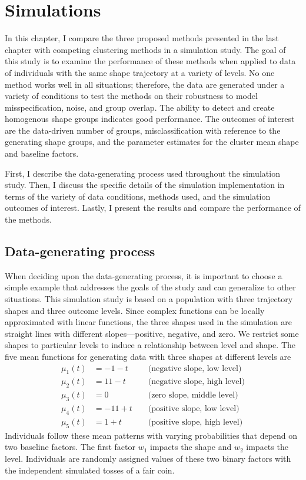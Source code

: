 \chapter{Simulations}
\label{chap:sim}
In this chapter, I compare the three proposed methods presented in the last chapter with competing clustering methods in a simulation study. The goal of this study is to examine the performance of these methods when applied to data of individuals with the same shape trajectory at a variety of levels. No one method works well in all situations; therefore, the data are generated under a variety of conditions to test the methods on their robustness to model misspecification, noise, and group overlap. The ability to detect and create homogenous shape groups indicates good performance. The outcomes of interest are the data-driven number of groups, misclassification with reference to the generating shape groups, and the parameter estimates for the cluster mean shape and baseline factors. 

First, I describe the data-generating process used throughout the simulation study. Then, I discuss the specific details of the simulation implementation in terms of the variety of data conditions, methods used, and the simulation outcomes of interest. Lastly, I present the results and compare the performance of the methods.

\section{Data-generating process}
When deciding upon the data-generating process, it is important to choose a simple example that addresses the goals of the study and can generalize to other situations. This simulation study is based on a population with three trajectory shapes and three outcome levels. Since complex functions can be locally approximated with linear functions, the three shapes used in the simulation are straight lines with different slopes---positive, negative, and zero. We restrict some shapes to particular levels to induce a relationship between level and shape. The five mean functions for generating data with three shapes at different levels are  
\begin{align*}
\mu_{1}(t) &= -1 - t &&\text{ (negative slope, low level)}\\
\mu_{2}(t) &= 11 - t&&\text{ (negative slope, high level)}\\
\mu_{3}(t) &= 0&&\text{ (zero slope, middle level)}\\
\mu_{4}(t) &= -11 + t&&\text{ (positive slope, low level)}\\
\mu_{5}(t) &= 1 + t&&\text{ (positive slope, high level)}
\end{align*} 
Individuals follow these mean patterns with varying probabilities that depend on two baseline factors. The first factor $w_{1}$ impacts the shape and $w_{2}$ impacts the level. Individuals are randomly assigned values of these two binary factors with the independent simulated tosses of a fair coin. 

